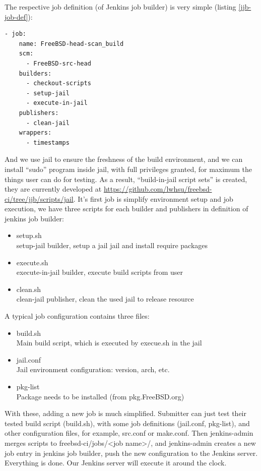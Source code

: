 \documentclass[a4paper,twocolumn,10pt]{article}
\begin{document}
The respective job definition (of Jenkins job builder) is very simple
(listing \ref{jjb-job-def}):

\begin{lstlisting}[caption=Job definition,label=jjb-job-def]
- job:
    name: FreeBSD-head-scan_build
    scm:
      - FreeBSD-src-head
    builders:
      - checkout-scripts
      - setup-jail
      - execute-in-jail
    publishers:
      - clean-jail
    wrappers:
      - timestamps
\end{lstlisting}

And we use jail to ensure the freshness of the build environment, and we can
install ``sudo'' program inside jail, with full privileges granted, for maximum
the things user can do for testing. As a result, ``build-in-jail script sets''
is created, they are currently developed at
\url{https://github.com/lwhsu/freebsd-ci/tree/jjb/scripts/jail}. It's first job
is simplify environment setup and job execution, we have three scripts for each
builder and publishers in definition of jenkins job builder:

\begin{itemize}
\item setup.sh\\
  setup-jail builder, setup a jail jail and install require packages
\item execute.sh\\
  execute-in-jail builder, execute build scripts from user
\item clean.sh\\
  clean-jail publisher, clean the used jail to release resource
\end{itemize}

A typical job configuration contains three files:

\begin{itemize}
\item build.sh\\
  Main build script, which is executed by execue.sh in the jail
\item jail.conf\\
  Jail environment configuration: version, arch, etc.
\item pkg-list\\
  Package needs to be installed (from pkg.FreeBSD.org)
\end{itemize}

With these, adding a new job is much simplified. Submitter can just test their
tested build script (build.sh), with some job definitions (jail.conf,
pkg-list), and other configuration files, for example, src.conf or make.conf.
Then jenkins-admin merges scripts to freebsd-ci/jobs/<job name>/, and
jenkins-admin creates a new job entry in jenkins job builder, push the new
configuration to the Jenkins server. Everything is done. Our Jenkins server
will execute it around the clock.
\end{document}
